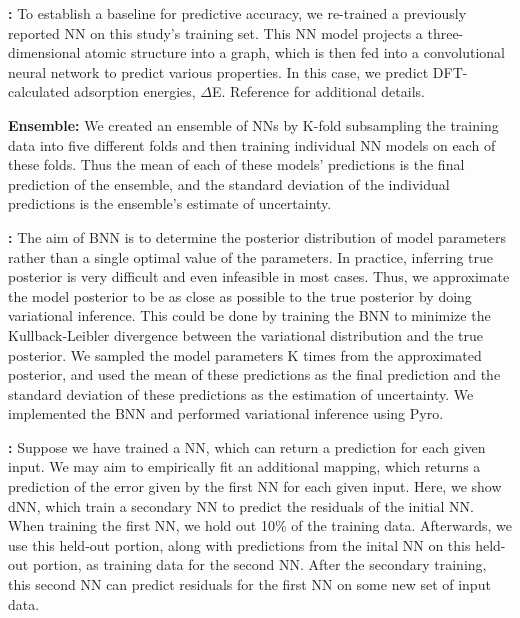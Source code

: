 \documentclass[]{achemso}
\begin{document}
\textbf{:}
To establish a baseline for predictive accuracy, we re-trained a previously reported \gls{NN}\cite{Xie2018, Back2019} on this study's training set.
This \gls{NN} model projects a three-dimensional atomic structure into a graph, which is then fed into a convolutional neural network to predict various properties.
In this case, we predict \gls{DFT}-calculated adsorption energies, $\Delta$E.
Reference \citet{Back2019} for additional details.

\textbf{ Ensemble:}
We created an ensemble of \gls{NN}s by K-fold subsampling the training data into five different folds and then training individual \gls{NN} models on each of these folds.
Thus the mean of each of these models' predictions is the final prediction of the ensemble, and the standard deviation of the individual predictions is the ensemble's estimate of uncertainty.

\textbf{:}
The aim of \gls{BNN} is to determine the posterior distribution of model parameters rather than a single optimal value of the parameters.
In practice, inferring true posterior is very difficult and even infeasible in most cases.
Thus, we approximate the model posterior to be as close as possible to the true posterior by doing variational inference.
This could be done by training the \gls{BNN} to minimize the Kullback-Leibler divergence between the variational distribution and the true posterior.
We sampled the model parameters K times from the approximated posterior, and used the mean of these predictions as the final prediction and the standard deviation of these predictions as the estimation of uncertainty.
We implemented the \gls{BNN} and performed variational inference using Pyro.\cite{Bingham2018}

\textbf{:}
Suppose we have trained a NN, which can return a prediction for each given
input.  We may aim to empirically fit an additional mapping, which returns a
prediction of the error given by the first NN for each given input. Here, we
show \gls{dNN}, which train a secondary \gls{NN} to predict the residuals of
the initial \gls{NN}. When training the first NN, we hold out 10\% of the
training data.  Afterwards, we use this held-out portion, along with
predictions from the inital NN on this held-out portion, as training data for
the second NN. After the secondary training, this second NN can predict
residuals for the first NN on some new set of input data.
\end{document}
